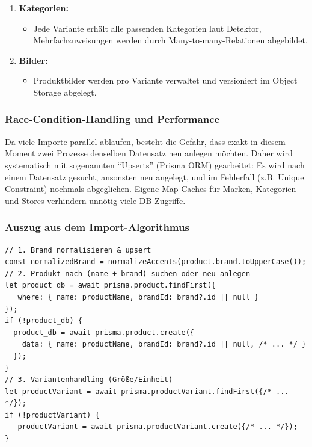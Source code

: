 \documentclass[12pt, a4paper]{report} %
\begin{document}
\begin{enumerate}
    \item \textbf{Kategorien:}
        \begin{itemize}
            \item Jede Variante erhält alle passenden Kategorien laut Detektor, Mehrfachzuweisungen werden durch Many-to-many-Relationen abgebildet.
        \end{itemize}
    \item \textbf{Bilder:}
        \begin{itemize}
            \item Produktbilder werden pro Variante verwaltet und versioniert im Object Storage abgelegt.
        \end{itemize}
\end{enumerate}

\subsubsection{Race-Condition-Handling und Performance}
Da viele Importe parallel ablaufen, besteht die Gefahr, dass exakt in diesem Moment zwei Prozesse denselben Datensatz neu anlegen möchten. Daher wird systematisch mit sogenannten "`Upserts"' (Prisma ORM) gearbeitet: Es wird nach einem Datensatz gesucht, ansonsten neu angelegt, und im Fehlerfall (z.B. Unique Constraint) nochmals abgeglichen. Eigene Map-Caches für Marken, Kategorien und Stores verhindern unnötig viele DB-Zugriffe.

\subsubsection{Auszug aus dem Import-Algorithmus}
\begin{lstlisting}[style=typescriptstyle, caption={Produkt-Import: Algorithmus bei Name-Matching und DB-Schreibvorgang}]
// 1. Brand normalisieren & upsert
const normalizedBrand = normalizeAccents(product.brand.toUpperCase());
// 2. Produkt nach (name + brand) suchen oder neu anlegen
let product_db = await prisma.product.findFirst({
   where: { name: productName, brandId: brand?.id || null }
});
if (!product_db) {
  product_db = await prisma.product.create({
    data: { name: productName, brandId: brand?.id || null, /* ... */ }
  });
}
// 3. Variantenhandling (Größe/Einheit)
let productVariant = await prisma.productVariant.findFirst({/* ... */});
if (!productVariant) {
   productVariant = await prisma.productVariant.create({/* ... */});
}
\end{lstlisting}
\end{document}

